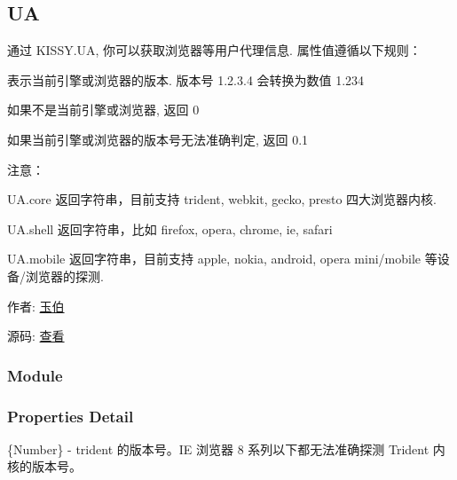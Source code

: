 \documentclass[letterpaper,10pt,english]{sphinxmanual}
\begin{document}
\subsection{UA}
\label{api/core/ua/index:ua}\label{api/core/ua/index::doc}
\begin{DUlineblock}{0em}
\item[] 通过 KISSY.UA, 你可以获取浏览器等用户代理信息. 属性值遵循以下规则：
\item[]
\begin{DUlineblock}{\DUlineblockindent}
\item[] 表示当前引擎或浏览器的版本. 版本号 1.2.3.4 会转换为数值 1.234
\item[] 如果不是当前引擎或浏览器, 返回 0
\item[] 如果当前引擎或浏览器的版本号无法准确判定, 返回 0.1
\end{DUlineblock}
\item[] 注意：
\item[]
\begin{DUlineblock}{\DUlineblockindent}
\item[] UA.core 返回字符串，目前支持 trident, webkit, gecko, presto 四大浏览器内核.
\item[] UA.shell 返回字符串，比如 firefox, opera, chrome, ie, safari
\item[] UA.mobile 返回字符串，目前支持 apple, nokia, android, opera mini/mobile 等设备/浏览器的探测.
\end{DUlineblock}
\item[] 作者: \href{mailto:lifesinger@gmail.com}{玉伯}
\item[] 源码: \href{https://github.com/kissyteam/kissy/tree/master/src/ua}{查看}
\end{DUlineblock}


\subsubsection{Module}
\label{api/core/ua/index:module}\begin{quote}

{\hyperref[api/core/ua/index:module-UA]{}}
\end{quote}


\subsubsection{Properties Detail}
\label{api/core/ua/index:properties-detail}

\begin{fulllineitems}
\label{api/core/ua/index:UA.trident}
\{Number\} - trident 的版本号。IE 浏览器 8 系列以下都无法准确探测 Trident 内核的版本号。

\end{fulllineitems}
\end{document}
